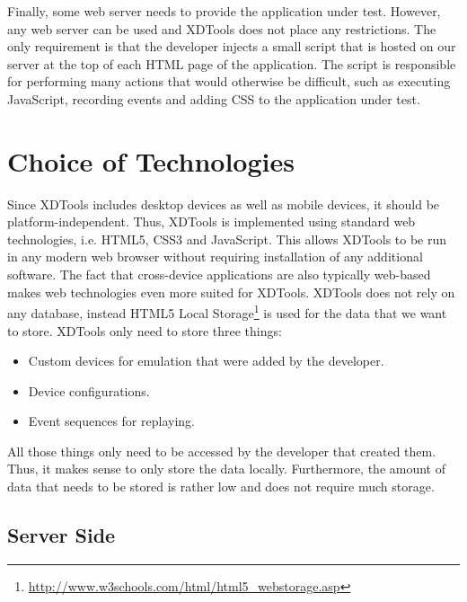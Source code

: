 Finally, some web server needs to provide the application under test. However, any web server can be used and XDTools does not place any restrictions. The only requirement is that the developer injects a small script that is hosted on our server at the top of each HTML page of the application. The script is responsible for performing many actions that would otherwise be difficult, such as executing JavaScript, recording events and adding CSS to the application under test.

\section{Choice of Technologies}

Since XDTools includes desktop devices as well as mobile devices, it should be platform-independent. Thus, XDTools is implemented using standard web technologies, i.e. HTML5, CSS3 and JavaScript. This allows XDTools to be run in any modern web browser without requiring installation of any additional software. The fact that cross-device applications are also typically web-based makes web technologies even more suited for XDTools. XDTools does not rely on any database, instead HTML5 Local Storage\footnote{\url{http://www.w3schools.com/html/html5_webstorage.asp}} is used for the data that we want to store. XDTools only need to store three things:
\begin{itemize}
	\item Custom devices for emulation that were added by the developer.
	\item Device configurations.
	\item Event sequences for replaying.
\end{itemize}
All those things only need to be accessed by the developer that created them. Thus, it makes sense to only store the data locally. Furthermore, the amount of data that needs to be stored is rather low and does not require much storage. 

\subsection{Server Side}

